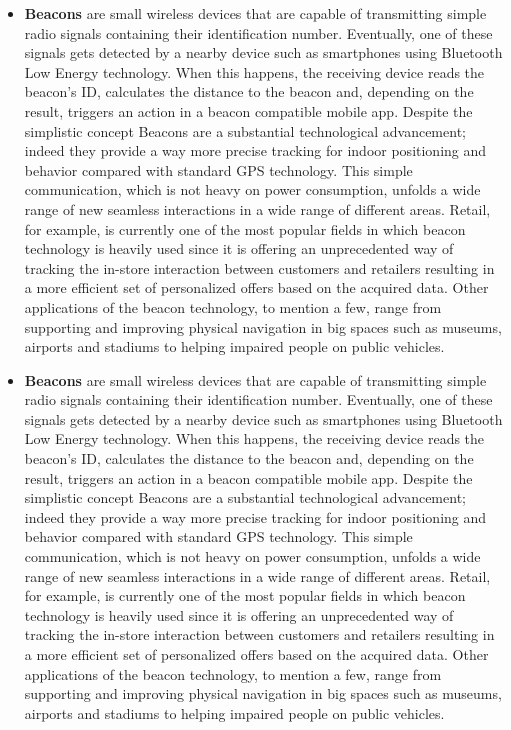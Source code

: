 \begin{itemize}
  \item \textbf{Beacons} are small wireless devices that are capable of transmitting simple radio signals containing their identification number. Eventually, one of these signals gets detected by a nearby device such as smartphones using Bluetooth Low Energy technology. When this happens, the receiving device reads the beacon's ID, calculates the distance to the beacon and, depending on the result, triggers an action in a beacon compatible mobile app. Despite the simplistic concept Beacons are a substantial technological advancement; indeed they provide a way more precise tracking for indoor positioning and behavior compared with standard GPS technology. This simple communication, which is not heavy on power consumption, unfolds a wide range of new seamless interactions in a wide range of different areas. Retail, for example, is currently one of the most popular fields in which beacon technology is heavily used since it is offering an unprecedented way of tracking the in-store interaction between customers and retailers resulting in a more efficient set of personalized offers based on the acquired data. Other applications of the beacon technology, to mention a few, range from supporting and improving physical navigation in big spaces such as museums, airports and stadiums to helping impaired people on public vehicles.

  \item \textbf{Beacons} are small wireless devices that are capable of transmitting simple radio signals containing their identification number. Eventually, one of these signals gets detected by a nearby device such as smartphones using Bluetooth Low Energy technology. When this happens, the receiving device reads the beacon's ID, calculates the distance to the beacon and, depending on the result, triggers an action in a beacon compatible mobile app. Despite the simplistic concept Beacons are a substantial technological advancement; indeed they provide a way more precise tracking for indoor positioning and behavior compared with standard GPS technology. This simple communication, which is not heavy on power consumption, unfolds a wide range of new seamless interactions in a wide range of different areas. Retail, for example, is currently one of the most popular fields in which beacon technology is heavily used since it is offering an unprecedented way of tracking the in-store interaction between customers and retailers resulting in a more efficient set of personalized offers based on the acquired data. Other applications of the beacon technology, to mention a few, range from supporting and improving physical navigation in big spaces such as museums, airports and stadiums to helping impaired people on public vehicles.
  
\end{itemize} 

